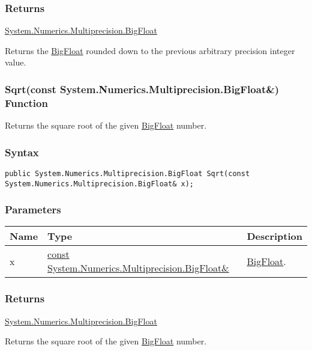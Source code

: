 \documentclass[a4paper,oneside,11.000000pt]{book}
\begin{document}
\subsubsection*{Returns}
\hyperlink{System.Numerics.Multiprecision.BigFloat}{System.\-Numerics.\-Multiprecision.\-BigFloat}
\begin{flushleft}
Returns the \hyperlink{System.Numerics.Multiprecision.BigFloat}{BigFloat} rounded down to the previous arbitrary precision integer value.

\end{flushleft}
\clearpage

\hypertarget{System.Numerics.Multiprecision.Sqrt.C.R.System.Numerics.Multiprecision.BigFloat}{\subsubsection*{Sqrt(const System.Numerics.Multiprecision.BigFloat\&) Function}}
\begin{flushleft}
Returns the square root of the given \hyperlink{System.Numerics.Multiprecision.BigFloat}{BigFloat} number.

\end{flushleft}
\subsubsection*{Syntax}
\texttt{public System.Numerics.Multiprecision.BigFloat Sqrt(const System.Numerics.Multiprecision.BigFloat\& x);}
\subsubsection*{Parameters}
\begin{flushleft}
\begin{supertabular}[l]{!{\raggedright}p{1.30721cm}!{\raggedright}p{8.55945cm}!{\raggedright}p{2.65538cm}}
\textbf{Name}
& \textbf{Type}
& \textbf{Description}
\\
\hline
x
& \hyperlink{System.Numerics.Multiprecision.BigFloat}{const System.\-Numerics.\-Multiprecision.\-BigFloat\&\-}
& \hyperlink{System.Numerics.Multiprecision.BigFloat}{BigFloat}.

\\
\end{supertabular}

\end{flushleft}
\subsubsection*{Returns}
\hyperlink{System.Numerics.Multiprecision.BigFloat}{System.\-Numerics.\-Multiprecision.\-BigFloat}
\begin{flushleft}
Returns the square root of the given \hyperlink{System.Numerics.Multiprecision.BigFloat}{BigFloat} number.

\end{flushleft}
\clearpage
\end{document}
